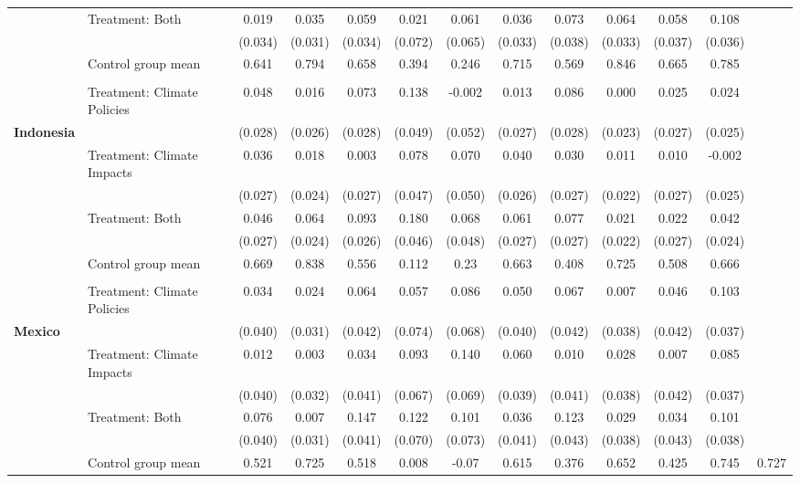 \begin{tabular}[t]{llccccccccccc}
 & Treatment: Both & 0.019 & 0.035 & 0.059 & 0.021 & 0.061 & 0.036 & 0.073 & 0.064 & 0.058 & 0.108\\
 &  & (0.034) & (0.031) & (0.034) & (0.072) & (0.065) & (0.033) & (0.038) & (0.033) & (0.037) & (0.036)\\
\midrule
 & Control group mean & 0.641 & 0.794 & 0.658 & 0.394 & 0.246 & 0.715 & 0.569 & 0.846 & 0.665 & 0.785\\
 &  &  &  &  &  &  &  &  &  &  & \\
 & Treatment: Climate Policies & 0.048 & 0.016 & 0.073 & 0.138 & -0.002 & 0.013 & 0.086 & 0.000 & 0.025 & 0.024\\
\textbf{Indonesia} &  & (0.028) & (0.026) & (0.028) & (0.049) & (0.052) & (0.027) & (0.028) & (0.023) & (0.027) & (0.025)\\
 & Treatment: Climate Impacts & 0.036 & 0.018 & 0.003 & 0.078 & 0.070 & 0.040 & 0.030 & 0.011 & 0.010 & -0.002\\
 &  & (0.027) & (0.024) & (0.027) & (0.047) & (0.050) & (0.026) & (0.027) & (0.022) & (0.027) & (0.025)\\
 & Treatment: Both & 0.046 & 0.064 & 0.093 & 0.180 & 0.068 & 0.061 & 0.077 & 0.021 & 0.022 & 0.042\\
 &  & (0.027) & (0.024) & (0.026) & (0.046) & (0.048) & (0.027) & (0.027) & (0.022) & (0.027) & (0.024)\\
\midrule
 & Control group mean & 0.669 & 0.838 & 0.556 & 0.112 & 0.23 & 0.663 & 0.408 & 0.725 & 0.508 & 0.666\\
 &  &  &  &  &  &  &  &  &  &  & \\
 & Treatment: Climate Policies & 0.034 & 0.024 & 0.064 & 0.057 & 0.086 & 0.050 & 0.067 & 0.007 & 0.046 & 0.103\\
\textbf{Mexico} &  & (0.040) & (0.031) & (0.042) & (0.074) & (0.068) & (0.040) & (0.042) & (0.038) & (0.042) & (0.037)\\
 & Treatment: Climate Impacts & 0.012 & 0.003 & 0.034 & 0.093 & 0.140 & 0.060 & 0.010 & 0.028 & 0.007 & 0.085\\
 &  & (0.040) & (0.032) & (0.041) & (0.067) & (0.069) & (0.039) & (0.041) & (0.038) & (0.042) & (0.037)\\
 & Treatment: Both & 0.076 & 0.007 & 0.147 & 0.122 & 0.101 & 0.036 & 0.123 & 0.029 & 0.034 & 0.101\\
 &  & (0.040) & (0.031) & (0.041) & (0.070) & (0.073) & (0.041) & (0.043) & (0.038) & (0.043) & (0.038)\\
\midrule
 & Control group mean & 0.521 & 0.725 & 0.518 & 0.008 & -0.07 & 0.615 & 0.376 & 0.652 & 0.425 & 0.745 & 0.727\\

\end{tabular}
